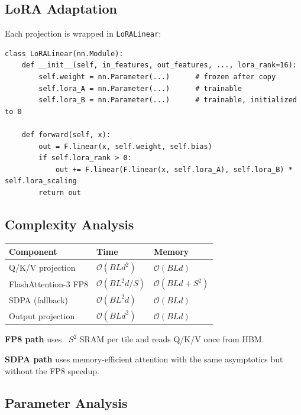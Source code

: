 \subsection{LoRA Adaptation}

Each projection is wrapped in \texttt{LoRALinear}:

\begin{lstlisting}
class LoRALinear(nn.Module):
    def __init__(self, in_features, out_features, ..., lora_rank=16):
        self.weight = nn.Parameter(...)      # frozen after copy
        self.lora_A = nn.Parameter(...)      # trainable
        self.lora_B = nn.Parameter(...)      # trainable, initialized to 0
    
    def forward(self, x):
        out = F.linear(x, self.weight, self.bias)
        if self.lora_rank > 0:
            out += F.linear(F.linear(x, self.lora_A), self.lora_B) * self.lora_scaling
        return out
\end{lstlisting}

\subsection{Complexity Analysis}

\begin{table}[H]
\centering
\small
\begin{tabular}{lll}
\toprule
\textbf{Component} & \textbf{Time} & \textbf{Memory} \\
\midrule
Q/K/V projection & $\mathcal{O}(BLd^2)$ & $\mathcal{O}(BLd)$ \\
FlashAttention-3 FP8 & $\mathcal{O}(BL^2 d / S)$ & $\mathcal{O}(BLd + S^2)$ \\
SDPA (fallback) & $\mathcal{O}(BL^2 d)$ & $\mathcal{O}(BLd)$ \\
Output projection & $\mathcal{O}(BLd^2)$ & $\mathcal{O}(BLd)$ \\
\bottomrule
\end{tabular}
\end{table}

\textbf{FP8 path} uses ~$S^2$ SRAM per tile and reads Q/K/V once from HBM.

\textbf{SDPA path} uses memory-efficient attention with the same asymptotics but 
without the FP8 speedup.

\subsection{Parameter Analysis}

